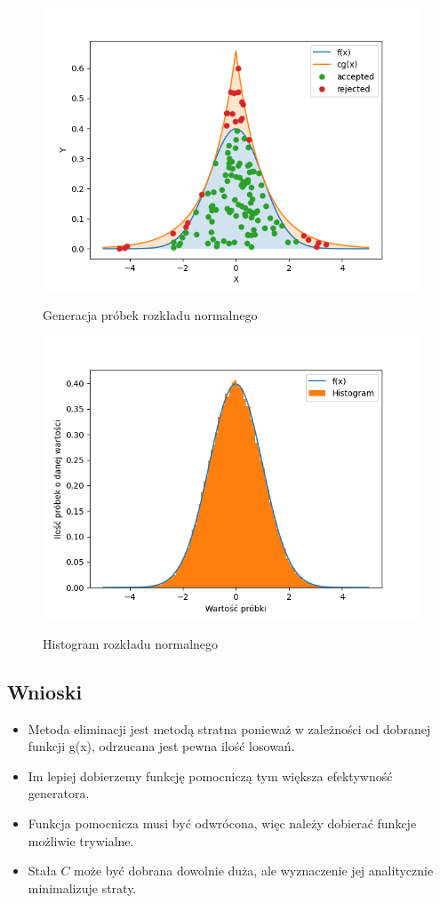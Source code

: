 \documentclass[12pt,a4paper]{article}
\begin{document}
\begin{figure}[H]
  \centering
  \includegraphics[height=0.4\textheight]{figures/Figure_29.png}
  \label{fig:29}
  \caption{Generacja próbek rozkładu normalnego}
\end{figure}

\begin{figure}[H]
  \centering
  \includegraphics[height=0.4\textheight]{figures/Figure_30.png}
  \label{fig:30}
  \caption{Histogram rozkładu normalnego}

\end{figure}

\subsection{Wnioski}
\begin{itemize}
  \item Metoda eliminacji jest metodą stratna ponieważ w zależności od dobranej funkcji g(x), odrzucana jest pewna ilość losowań.
  \item Im lepiej dobierzemy funkcję pomocniczą tym większa efektywność generatora.
  \item Funkcja pomocnicza musi być odwrócona, więc należy dobierać funkcje możliwie trywialne.
  \item Stała $C$ może być dobrana dowolnie duża, ale wyznaczenie jej analitycznie minimalizuje straty.
\end{itemize}
\end{document}
